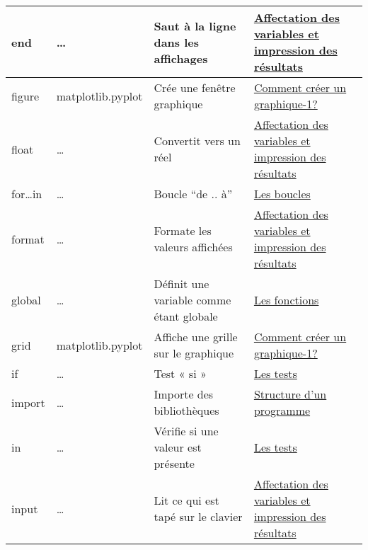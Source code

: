 \begin{longtable}{@{\extracolsep{\fill}}|p{} | p{} |p{} | p{}|@{}}
end
 & 
\ldots{}
 & 
Saut à la ligne dans les affichages
 & 
\href{https://pyspc.readthedocs.io/fr/latest/05-bases/02-variables_input_print.html}{Affectation
des variables et impression des résultats}
\\ \hline

figure
 & 
matplotlib.pyplot
 & 
Crée une fenêtre graphique
 & 
\href{https://pyspc.readthedocs.io/fr/latest/05-bases/10-graphiques_partie_1.html}{Comment
créer un graphique-1?}
\\ \hline

float
 & 
\ldots{}
 & 
Convertit vers un réel
 & 
\href{https://pyspc.readthedocs.io/fr/latest/05-bases/02-variables_input_print.html}{Affectation
des variables et impression des résultats}
\\ \hline

for\ldots{}in
 & 
\ldots{}
 & 
Boucle ``de .. à''
 & 
\href{https://pyspc.readthedocs.io/fr/latest/05-bases/06-boucles.html}{Les
boucles}
\\ \hline

format
 & 
\ldots{}
 & 
Formate les valeurs affichées
 & 
\href{https://pyspc.readthedocs.io/fr/latest/05-bases/02-variables_input_print.html}{Affectation
des variables et impression des résultats}
\\ \hline

global
 & 
\ldots{}
 & 
Définit une variable comme étant globale
 & 
\href{https://pyspc.readthedocs.io/fr/latest/05-bases/05-bases/07-fonctions.html}{Les
fonctions}
\\ \hline

grid
 & 
matplotlib.pyplot
 & 
Affiche une grille sur le graphique
 & 
\href{https://pyspc.readthedocs.io/fr/latest/05-bases/10-graphiques_partie_1.html}{Comment
créer un graphique-1?}
\\ \hline

if
 & 
\ldots{}
 & 
Test « si »
 & 
\href{https://pyspc.readthedocs.io/fr/latest/05-bases/05-tests.html}{Les
tests}
\\ \hline

import
 & 
\ldots{}
 & 
Importe des bibliothèques
 & 
\href{https://pyspc.readthedocs.io/fr/latest/05-bases/01-structure-programme.html}{Structure
d'un programme}
\\ \hline

in
 & 
\ldots{}
 & 
Vérifie si une valeur est présente
 & 
\href{https://pyspc.readthedocs.io/fr/latest/05-bases/05-tests.html}{Les
tests}
\\ \hline

input
 & 
\ldots{}
 & 
Lit ce qui est tapé sur le clavier
 & 
\href{https://pyspc.readthedocs.io/fr/latest/05-bases/02-variables_input_print.html}{Affectation
des variables et impression des résultats}
\\ \hline


\end{longtable}
